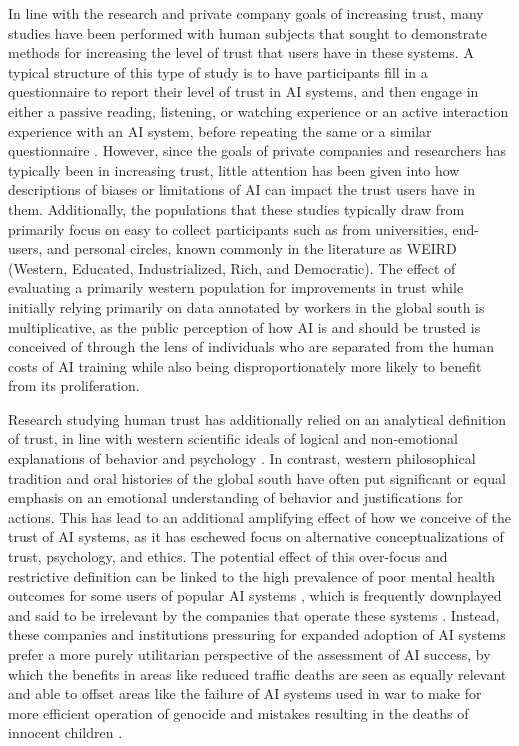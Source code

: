 \documentclass[a4paper,fleqn]{cas-sc}
\begin{document}
In line with the research and private company goals of increasing trust, many studies have been performed with human subjects that sought to demonstrate methods for increasing the level of trust that users have in these systems. A typical structure of this type of study is to have participants fill in a questionnaire to report their level of trust in AI systems, and then engage in either a passive reading, listening, or watching experience or an active interaction experience with an AI system, before repeating the same or a similar questionnaire \cite{}.  However, since the goals of private companies and researchers has typically been in increasing trust, little attention has been given into how descriptions of biases or limitations of AI can impact the trust users have in them. Additionally, the populations that these studies typically draw from primarily focus on easy to collect participants such as from universities, end-users, and personal circles, known commonly in the literature as WEIRD (Western, Educated, Industrialized, Rich, and Democratic). The effect of evaluating a primarily western population for improvements in trust while initially relying primarily on data annotated by workers in the global south is multiplicative, as the public perception of how AI is and should be trusted is conceived of through the lens of individuals who are separated from the human costs of AI training while also being disproportionately more likely to benefit from its proliferation. 

Research studying human trust has additionally relied on an analytical definition of trust, in line with western scientific ideals of logical and non-emotional explanations of behavior and psychology \cite{}. In contrast, western philosophical tradition and oral histories of the global south have often put significant or equal emphasis on an emotional understanding of behavior and justifications for actions. This has lead to an additional amplifying effect of how we conceive of the trust of AI systems, as it has eschewed focus on alternative conceptualizations of trust, psychology, and ethics. The potential effect of this over-focus and restrictive definition can be linked to the high prevalence of poor mental health outcomes for some users of popular AI systems \cite{}, which is frequently downplayed and said to be irrelevant by the companies that operate these systems \cite{}. Instead, these companies and institutions pressuring for expanded adoption of AI systems prefer a more purely utilitarian perspective of the assessment of AI success, by which the benefits in areas like reduced traffic deaths are seen as equally relevant and able to offset areas like the failure of AI systems used in war to make for more efficient operation of genocide \cite{} and mistakes resulting in the deaths of innocent children \cite{}. 
\end{document}
